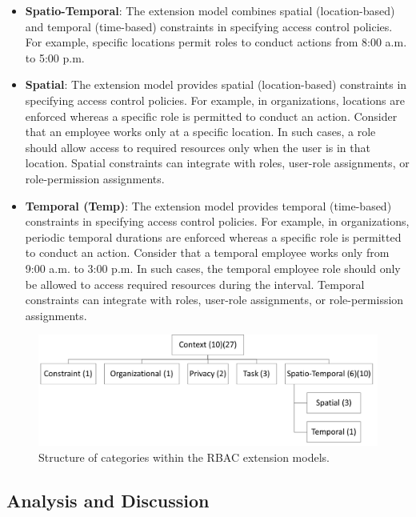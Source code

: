 \begin{itemize}
  \item \textbf{Spatio-Temporal}: The extension model combines spatial (location-based) and temporal (time-based) constraints in specifying access control policies. For example, specific locations permit roles to conduct actions from 8:00 a.m. to 5:00 p.m.

  \item \textbf{Spatial}: The extension model provides spatial (location-based) constraints in specifying access
	control policies. For example, in organizations, locations are enforced whereas a
	specific role is permitted to conduct an action. Consider that an employee works only at a specific location.
	In such cases, a role should allow access to required resources only when the user is in that location. 
	Spatial constraints can integrate with roles, user-role assignments, or role-permission assignments. 

  \item \textbf{Temporal (Temp)}:  The extension model provides temporal (time-based) constraints in specifying access
	control policies. For example, in organizations, periodic temporal durations are enforced whereas a
	specific role is permitted to conduct an action. Consider that a temporal employee works only from 9:00 a.m. to 3:00 p.m.
	In such cases, the temporal employee role should only be allowed to access required resources during the interval. 
	Temporal constraints can integrate with roles, user-role assignments, or role-permission assignments.   
	
\end{itemize}

\begin{figure}[ht]
    \centering
        \includegraphics[width=6.0in]{sections/category_structrure.png}
    \caption{\label{fig:category_structrure}Structure of categories within the RBAC extension models.}
\end{figure}

\subsection{Analysis and Discussion}


